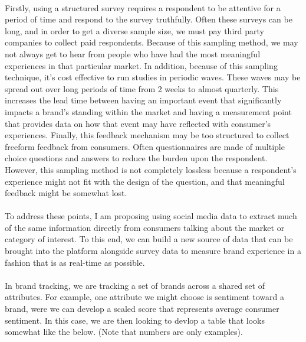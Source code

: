 \documentclass{article}
\begin{document}
\paragraph{} Firstly, using a structured survey requires a respondent to be attentive for a period of time and respond to the survey truthfully. Often these surveys can be long, and in order to get a diverse sample size, we must pay third party companies to collect paid respondents. Because of this sampling method, we may not always get to hear from people who have had the most meaningful experiences in that particular market. In addition, because of this sampling technique, it's cost effective to run studies in periodic waves. These waves may be spread out over long periods of time from 2 weeks to almost quarterly. This increases the lead time between having an important event that significantly impacts a brand's standing within the market and having a measurement point that provides data on how that event may have reflected with consumer's experiences. Finally, this feedback mechanism may be too structured to collect freeform feedback from consumers. Often questionnaires are made of multiple choice questions and answers to reduce the burden upon the respondent. However, this sampling method is not completely lossless because a respondent's experience might not fit with the design of the question, and that meaningful feedback might be somewhat lost.

\paragraph{} To address these points, I am proposing using social media data to extract much of the same information directly from consumers talking about the market or category of interest. To this end, we can build a new source of data that can be brought into the platform alongside survey data to measure brand experience in a fashion that is as real-time as possible.

\paragraph{} In brand tracking, we are tracking a set of brands across a shared set of attributes. For example, one attribute we might choose is sentiment toward a brand, were we can develop a scaled score that represents average consumer sentiment. In this case, we are then looking to devlop a table that looks somewhat like the below. (Note that numbers are only examples).
\end{document}
